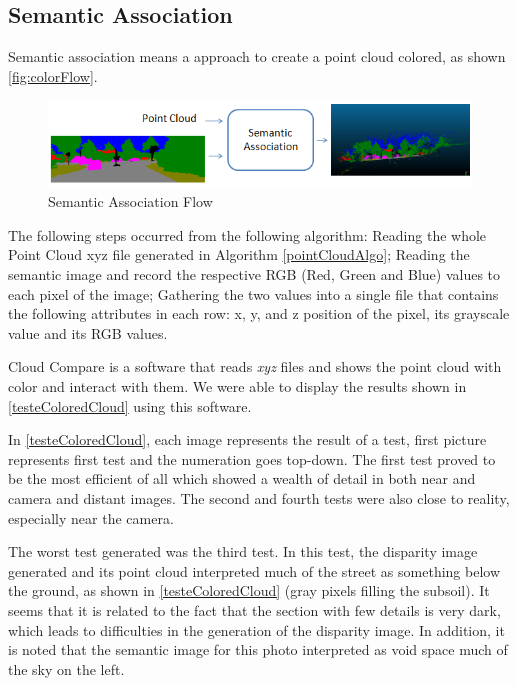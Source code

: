 \subsection{Semantic Association}

    Semantic association means a approach to create a point cloud colored, as shown \autoref{fig:colorFlow}.
    
    \begin{figure}[H]
        \caption{
        \label{fig:colorFlow}
            Semantic Association Flow}
        \begin{center}
        \includegraphics[width=1\textwidth]{images/colorFlow.png}
        \end{center}
    \end{figure}
    
    The following steps occurred from the following algorithm: Reading the whole Point Cloud xyz file generated in Algorithm \autoref{pointCloudAlgo}; Reading the semantic image and record the respective RGB (Red, Green and Blue) values to each pixel of the image; Gathering the two values into a single file that contains the following attributes in each row: x, y, and z position of the pixel, its grayscale value and its RGB values.

    Cloud Compare is a software that reads \textit{xyz} files and shows the point cloud with color and interact with them. We were able to display the results shown in \autoref{testeColoredCloud} using this software.

    In \autoref{testeColoredCloud}, each image represents the result of a test, first picture represents first test and the numeration goes top-down. The first test proved to be the most efficient of all which showed a wealth of detail in both near and camera and distant images. The second and fourth tests were also close to reality, especially near the camera.

    The worst test generated was the third test. In this test, the disparity image generated and its point cloud interpreted much of the street as something below the ground, as shown in \autoref{testeColoredCloud} (gray pixels filling the subsoil). It seems that it is related to the fact that the section with few details is very dark, which leads to difficulties in the generation of the disparity image. In addition, it is noted that the semantic image for this photo interpreted as void space much of the sky on the left.
    
